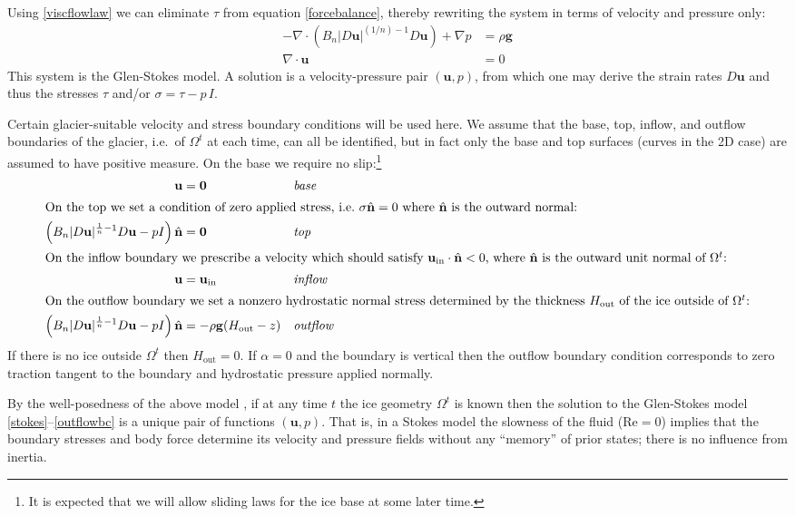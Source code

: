 \documentclass[letterpaper,final,12pt,reqno]{amsart}
\newcommand{\Div}{\nabla\cdot}
\newcommand{\hbn}{\hat{\mathbf{n}}}
\newcommand{\bg}{\mathbf{g}}
\newcommand{\bu}{\mathbf{u}}
\newcommand{\bzero}{\bm{0}}
\begin{document}
Using \eqref{viscflowlaw} we can eliminate $\tau$ from equation \eqref{forcebalance}, thereby rewriting the system in terms of velocity and pressure only:
\begin{align}
- \nabla \cdot \left(B_n |D\bu|^{(1/n) - 1} D\bu\right) + \nabla p &= \rho \mathbf{g} \label{stokes} \\
\Div \bu &= 0 \label{incompagain}
\end{align}
This system is the Glen-Stokes model.  A solution is a velocity-pressure pair $(\bu,p)$, from which one may derive the strain rates $D\bu$ and thus the stresses $\tau$ and/or $\sigma = \tau - p\,I$.

Certain glacier-suitable velocity and stress boundary conditions will be used here.  We assume that the base, top, inflow, and outflow boundaries of the glacier, i.e.~of $\Omega^t$ at each time, can all be identified, but in fact only the base and top surfaces (curves in the 2D case) are assumed to have positive measure.   On the base we require no slip:\footnote{It is expected that we will allow sliding laws for the ice base  \cite{JouvetRappaz2011} at some later time.}
\begin{align}
\bu &= \bzero  &&\text{\emph{base}} \label{basebc} \\
\intertext{On the top we set a condition of zero applied stress, i.e.~$\sigma\hbn=0$ where $\hbn$ is the outward normal:}
\left(B_n |D\bu|^{\frac{1}{n} - 1} D\bu - pI\right) \hbn &= \bzero  &&\text{\emph{top}} \label{topbc} \\
\intertext{On the inflow boundary we prescribe a velocity which should satisfy $\bu_{\text{in}}\cdot \hbn < 0$, where $\hbn$ is the outward unit normal of $\Omega^t$:}
\bu &= \bu_{\text{in}}  &&\text{\emph{inflow}} \label{inflowbc} \\
\intertext{On the outflow boundary we set a nonzero hydrostatic normal stress determined by the thickness $H_{\text{out}}$ of the ice outside of $\Omega^t$:}
\left(B_n |D\bu|^{\frac{1}{n} - 1} D\bu - pI\right) \hbn &= -\rho \bg (H_{\text{out}}-z) &&\text{\emph{outflow}} \label{outflowbc}
\end{align}
If there is no ice outside $\Omega^t$ then $H_{\text{out}}=0$.  If $\alpha=0$ and the boundary is vertical then the outflow boundary condition corresponds to zero traction tangent to the boundary and hydrostatic pressure applied normally.

By the well-posedness of the above model \cite{JouvetRappaz2011}, if at any time $t$ the ice geometry $\Omega^t$ is known then the solution to the Glen-Stokes model \eqref{stokes}--\eqref{outflowbc} is a unique pair of functions $(\bu,p)$.  That is, in a Stokes model the slowness of the fluid ($\text{Re}=0$) implies that the boundary stresses and body force determine its velocity and pressure fields without any ``memory'' of prior states; there is no influence from inertia.
\end{document}
